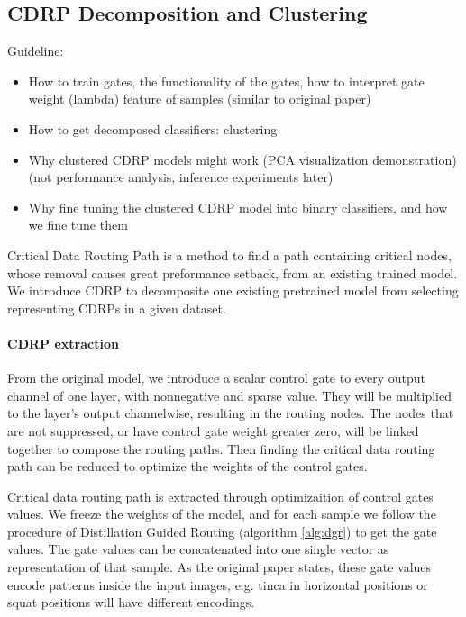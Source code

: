 \documentclass[sigplan,10pt,review]{acmart}\settopmatter{printfolios=true,printccs=false,printacmref=false}
\begin{document}
\subsection{CDRP Decomposition and Clustering}
Guideline:
\begin{itemize}
	\item How to train gates, the functionality of the gates, how to interpret gate weight (lambda) feature of samples (similar to original paper)
	\item How to get decomposed classifiers: clustering
	\item Why clustered CDRP models might work (PCA visualization demonstration) (not performance analysis, inference experiments later)
	\item Why fine tuning the clustered CDRP model into binary classifiers, and how we fine tune them
\end{itemize}

Critical Data Routing Path is a method to find a path containing critical nodes, whose removal causes great preformance setback, from an existing trained model. We introduce CDRP to decomposite one existing pretrained model from selecting representing CDRPs in a given dataset.

\paragraph{CDRP extraction}

From the original model, we introduce a scalar control gate to every output channel of one layer, with nonnegative and sparse value. They will be multiplied to the layer’s output channelwise, resulting in the routing nodes. The nodes that are not suppressed, or have control gate weight greater zero, will be linked together to compose the routing paths. Then finding the critical data routing path can be reduced to optimize the weights of the control gates.

Critical data routing path is extracted through optimizaition of control gates values. We freeze the weights of the model, and for each sample we follow the procedure of Distillation Guided Routing (algorithm \ref{alg:dgr}) \cite{wang2018interpret} to get the gate values. The gate values can be concatenated into one single vector as representation of that sample. As the original paper \cite{wang2018interpret} states, these gate values encode patterns inside the input images, e.g. tinca in horizontal positions or squat positions will have different encodings.
\end{document}
